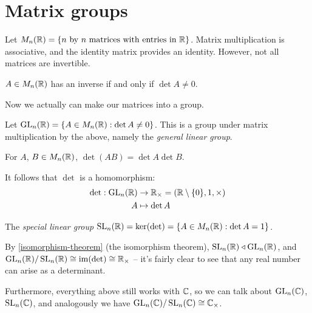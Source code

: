 \documentclass{../../template/note}
\begin{document}
    \section{Matrix groups}

    Let \(M_n(\mathbb R) = \{n \text{ by } n \text{ matrices with entries in } \mathbb R\}\). Matrix multiplication is associative, and the identity matrix provides an identity. However, not all matrices are invertible.
    
    \begin{lemma}
        \(A \in M_n(\mathbb R)\) has an inverse if and only if \(\det A \neq 0\).
    \end{lemma}
    
    Now we actually can make our matrices into a group.

    \begin{definition}
        Let \(\operatorname{GL}_n(\mathbb R) = \{A \in M_n(\mathbb R) : \det A \neq 0\}\). This is a group under matrix multiplication by the above, namely the \emph{general linear group}.
    \end{definition}
    
    \begin{lemma}
        For \(A\), \(B \in M_n(\mathbb R)\), \(\det(AB) = \det A \det B\).
    \end{lemma}
    
    \begin{corollary}
        It follows that \(\det\) is a homomorphism:
        \begin{align*}
            \det: \operatorname{GL}_n(\mathbb R) &\to \mathbb R_\times = (\mathbb R \setminus \{0\}, 1, \times) \\
            A &\mapsto \det A
        \end{align*}
    \end{corollary}
    
    \begin{definition}
        The \emph{special linear group} \(\operatorname{SL}_n(\mathbb R) = \ker (\det) = \{A \in M_n(\mathbb R): \det A = 1\}\).
    \end{definition}
    
    By \cref{isomorphism-theorem} (the isomorphism theorem), \(\operatorname{SL}_n(\mathbb R) \triangleleft \operatorname{GL}_n(\mathbb R)\), and \(\operatorname{GL}_n(\mathbb R) / \operatorname{SL}_n(\mathbb R) \cong \operatorname{im}(\det) \cong \mathbb R_\times\) -- it's fairly clear to see that any real number can arise as a determinant.

    Furthermore, everything above still works with \(\mathbb C\), so we can talk about \(\operatorname{GL}_n(\mathbb C)\), \(\operatorname{SL}_n(\mathbb C)\), and analogously we have \(\operatorname{GL}_n(\mathbb C) / \operatorname{SL}_n(\mathbb C) \cong \mathbb C_\times\).
    
\end{document}
